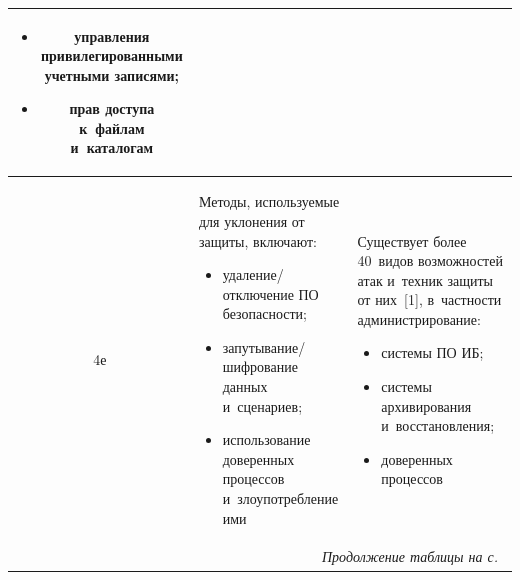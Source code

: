 \begin{table}
\begin{center}
\begin{tabular}{|c|p{58mm}|p{58mm}|}
\begin{itemize}
\item управления привилегированными учетными записями;  

\item прав доступа к~файлам и~каталогам\vspace*{-6pt}

\end{itemize}\\

\hline

4е&Методы, используемые для уклонения от защиты, включают:\vspace*{-6pt} 

\begin{itemize}

\addtolength{\itemsep}{-6pt}

\item удаление/отклю\-че\-ние ПО без\-опас\-ности;

\item запутывание/шифрование данных и~сценариев;

\item использование доверенных процессов и~злоупотребление ими\vspace*{-6pt}

\end{itemize}&Существует более 40~видов возможностей атак и~техник защиты от них~[1], в~частности администрирование:\vspace*{-6pt} 

\begin{itemize}

\addtolength{\itemsep}{-6pt}

\item системы ПО ИБ;

\item системы архивирования и~восстановления;

\item доверенных процессов\vspace*{-6pt}

\end{itemize}\\

\hline

\multicolumn{3}{r}{\textit{Продолжение таблицы на с.}~\pageref{s4}}

\end{tabular}

\end{center}

\vspace*{-1.83685pt}

\end{table}



